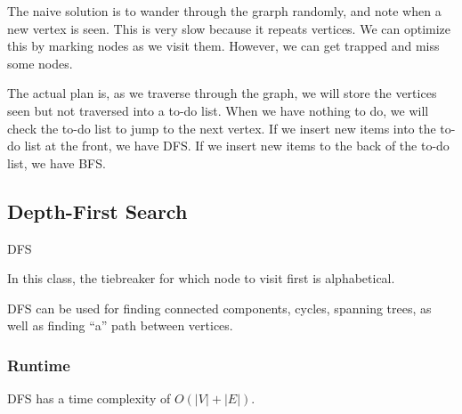 \documentclass[a4paper]{article}
\begin{document}
The naive solution is to wander through the grarph randomly, and note when a new vertex is seen. This is very slow because it repeats vertices. We can optimize this by marking nodes as we visit them. However, we can get trapped and miss some nodes.

The actual plan is, as we traverse through the graph, we will store the vertices seen but not traversed into a to-do list. When we have nothing to do, we will check the to-do list to jump to the next vertex. If we insert new items into the to-do list at the front, we have DFS. If we insert new items to the back of the to-do list, we have BFS.

\subsection{Depth-First Search}

\begin{algorithm}
	\caption{DFS}
\end{algorithm}

\begin{note}
	In this class, the tiebreaker for which node to visit first is alphabetical.
\end{note}

DFS can be used for finding connected components, cycles, spanning trees, as well as finding ``a'' path between vertices.

\subsubsection{Runtime}

DFS has a time complexity of \( O(|V|+|E|) \).
\end{document}
